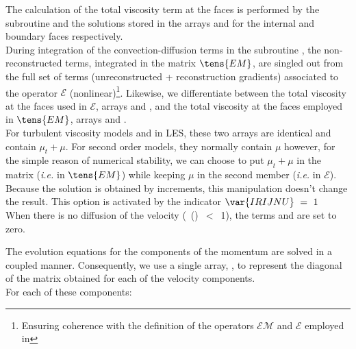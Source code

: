 The calculation of the total viscosity term at the faces is performed by the subroutine  and the solutions stored in the arrays  and  for the internal and boundary faces respectively.\\
During integration of the convection-diffusion terms in the subroutine , the non-reconstructed terms, integrated in the matrix $\tens{EM}$, are singled out from the full set of terms (unreconstructed +
reconstruction gradients) associated to the operator $\mathcal{E}$ (nonlinear)\footnote{ Ensuring coherence with the definition of the operators $\mathcal{EM}$ and $\mathcal{E}$ employed in  }.
Likewise, we differentiate between the total viscosity at the faces used in $\mathcal{E}$, arrays  and , and the total viscosity at the faces employed in $\tens{EM}$, arrays  and .\\
For turbulent viscosity models and in LES, these two arrays are identical and contain $\mu_t+\mu$.
For second order models, they normally contain $\mu$ however, for the simple reason of numerical stability, we can choose to put $\mu_t+\mu$ in the matrix (\textit{i.e.} in $\tens{EM}$) while keeping $\mu$ in the second member (\textit{i.e.} in $\mathcal{E}$). Because the solution is obtained by increments, this manipulation doesn't change the result. This option is activated by the indicator $\var{IRIJNU}\ =\ 1$\\
When there is no diffusion of the velocity (\ ()\ $<$\ 1), the terms  and  are set to zero.
\linebreak

The evolution equations for the components of the momentum are solved in a coupled manner. Consequently, we use a single array, , to represent the diagonal of the matrix obtained for each of the velocity components.\\
For each of these components:\\

